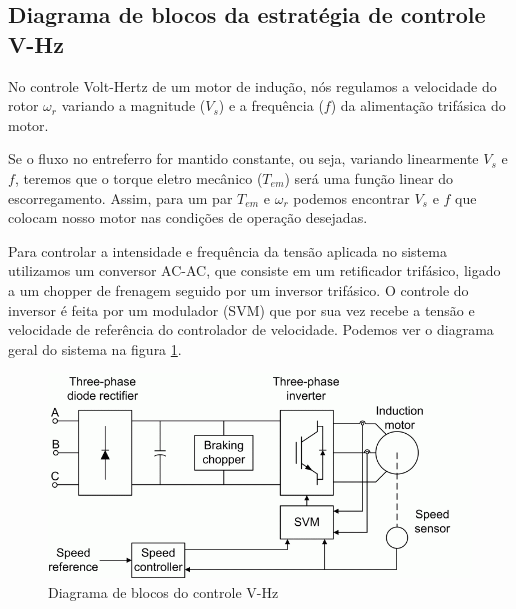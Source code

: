 \documentclass{article}
\begin{document}
\subsection{Diagrama de blocos da estratégia de controle V-Hz}
No controle Volt-Hertz de um motor de indução, nós  regulamos a velocidade do rotor $\omega_r$ variando a magnitude ($V_s$) e a frequência ($f$) da alimentação trifásica do motor.

Se o fluxo no entreferro for mantido constante, ou seja, variando linearmente $V_s$ e $f$, teremos que o torque eletro mecânico ($T_{em}$) será uma função linear do escorregamento. Assim, para um par $T_{em}$ e $\omega_r$ podemos encontrar $V_s$ e $f$ que colocam nosso motor nas condições de operação desejadas.

Para controlar a intensidade e frequência da tensão aplicada no sistema utilizamos um conversor AC-AC, que consiste em um retificador trifásico, ligado a um chopper de frenagem seguido por um inversor trifásico. O controle do inversor é feita por um modulador (SVM) que por sua vez recebe a tensão e velocidade de referência do controlador de velocidade. Podemos ver o diagrama geral do sistema na figura \ref{fig:esqG}.
\begin{figure}[H]
	\centering
	\includegraphics[width=\linewidth]{esqG}
	\caption{Diagrama de blocos do controle V-Hz \cite{bb:mathworks}}
	\label{fig:esqG}
\end{figure}
\end{document}
